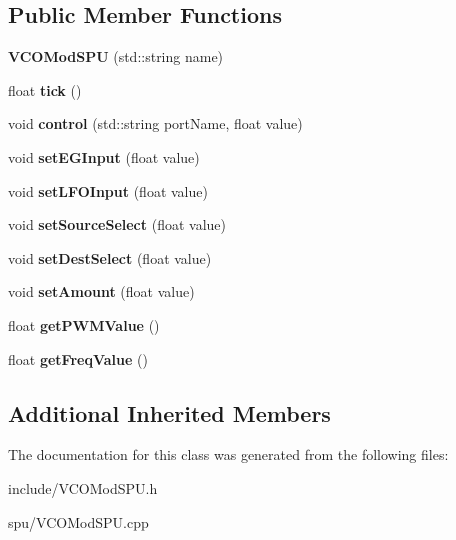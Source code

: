 \subsection*{Public Member Functions}
\begin{DoxyCompactItemize}
\item 
{\bfseries V\+C\+O\+Mod\+S\+PU} (std\+::string name)\hypertarget{classVCOModSPU_ae11ac554564dbae51b4f7d1a19f63dfc}{}\label{classVCOModSPU_ae11ac554564dbae51b4f7d1a19f63dfc}

\item 
float {\bfseries tick} ()\hypertarget{classVCOModSPU_a92982b411ee6a7d31eafa71678be6b63}{}\label{classVCOModSPU_a92982b411ee6a7d31eafa71678be6b63}

\item 
void {\bfseries control} (std\+::string port\+Name, float value)\hypertarget{classVCOModSPU_a300bde3f99008ce0b8a4ff38dc8c3201}{}\label{classVCOModSPU_a300bde3f99008ce0b8a4ff38dc8c3201}

\item 
void {\bfseries set\+E\+G\+Input} (float value)\hypertarget{classVCOModSPU_afecf559bef09d7b469e3ebedddd05866}{}\label{classVCOModSPU_afecf559bef09d7b469e3ebedddd05866}

\item 
void {\bfseries set\+L\+F\+O\+Input} (float value)\hypertarget{classVCOModSPU_a049f415e96c81b6dd63f99c7cc8fe35d}{}\label{classVCOModSPU_a049f415e96c81b6dd63f99c7cc8fe35d}

\item 
void {\bfseries set\+Source\+Select} (float value)\hypertarget{classVCOModSPU_af1e0d57fcd491271ce0775bad41c168a}{}\label{classVCOModSPU_af1e0d57fcd491271ce0775bad41c168a}

\item 
void {\bfseries set\+Dest\+Select} (float value)\hypertarget{classVCOModSPU_aaad0c1644bb9d44c33929fdb5c7a7ce2}{}\label{classVCOModSPU_aaad0c1644bb9d44c33929fdb5c7a7ce2}

\item 
void {\bfseries set\+Amount} (float value)\hypertarget{classVCOModSPU_a5c2f54cbe8e3d6a5bedd55783054da83}{}\label{classVCOModSPU_a5c2f54cbe8e3d6a5bedd55783054da83}

\item 
float {\bfseries get\+P\+W\+M\+Value} ()\hypertarget{classVCOModSPU_ad2434524030667ff7662bf4c0733cc77}{}\label{classVCOModSPU_ad2434524030667ff7662bf4c0733cc77}

\item 
float {\bfseries get\+Freq\+Value} ()\hypertarget{classVCOModSPU_ac1fef0a06f8362f8c723260cd3c6f0c2}{}\label{classVCOModSPU_ac1fef0a06f8362f8c723260cd3c6f0c2}

\end{DoxyCompactItemize}
\subsection*{Additional Inherited Members}


The documentation for this class was generated from the following files\+:\begin{DoxyCompactItemize}
\item 
include/V\+C\+O\+Mod\+S\+P\+U.\+h\item 
spu/V\+C\+O\+Mod\+S\+P\+U.\+cpp\end{DoxyCompactItemize}
